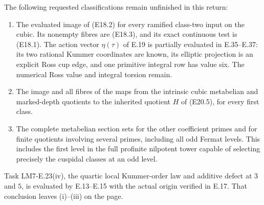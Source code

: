 \begin{proposition}
\label{E-remaining-tower}
The following requested classifications remain
unfinished in this return:
\begin{enumerate}[label=(\roman*)]
\item The evaluated image of (E18.2) for every
ramified class-two input on the cubic. Its nonempty
fibres are (E18.3), and its exact continuous test
is (E18.1). The action vector $\eta(\tau)$
of E.19 is partially evaluated in E.35--E.37:
its two rational Kummer coordinates are known,
its elliptic projection is an explicit Ross
cup edge, and one primitive integral row has
value six. The numerical Ross value and
integral torsion remain.
\item The image and all fibres of the maps from
the intrinsic cubic metabelian and marked-depth
quotients to the inherited quotient $H$ of
(E20.5), for every first class.
\item The complete metabelian section sets for
the other coefficient primes and for finite
quotients involving several primes, including
all odd Fermat levels. This includes the first
level in the full profinite nilpotent tower
capable of selecting precisely the cuspidal
classes at an odd level.
\end{enumerate}
Task LM7-E.23(iv), the quartic local Kummer-order
law and additive defect at $3$ and $5$, is
evaluated by E.13--E.15 with the actual origin
verified in E.17. That conclusion leaves
(i)--(iii) on the page.
\end{proposition}
